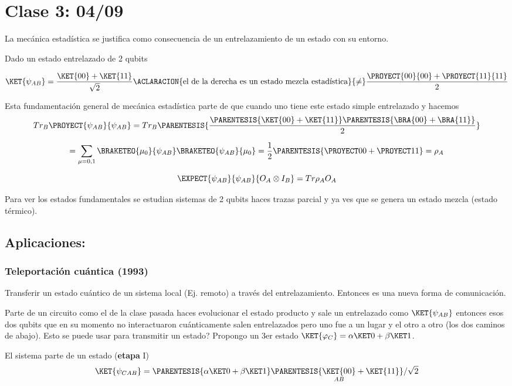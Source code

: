 \chapter{Clase 3: 04/09}

La mecánica estadística se justifica como consecuencia de un entrelazamiento
de un estado con su entorno.

Dado un estado entrelazado de 2 qubits

\[
\KET{\psi_{AB}}=\frac{\KET{00}+\KET{11}}{\sqrt{2}}\ACLARACION{\text{el de la derecha es un estado mezcla estadística}}{\neq}\frac{\PROYECT{00}{00}+\PROYECT{11}{11}}{2}
\]

Esta fundamentación general de mecánica estadística parte de que cuando
uno tiene este estado simple entrelazado y hacemos 
\[
Tr_{B}\PROYECT{\psi_{AB}}{\psi_{AB}}=Tr_{B}\PARENTESIS{\frac{\PARENTESIS{\KET{00}+\KET{11}}\PARENTESIS{\BRA{00}+\BRA{11}}}{2}}
\]

\[
=\sum_{\mu=0,1}\BRAKETEO{\mu_{0}}{\psi_{AB}}\BRAKETEO{\psi_{AB}}{\mu_{0}}=\frac{1}{2}\PARENTESIS{\PROYECT 00+\PROYECT 11}=\rho_{A}
\]

\[
\EXPECT{\psi_{AB}}{\psi_{AB}}{O_{A}\otimes I_{B}}=Tr\rho_{A}O_{A}
\]

Para ver los estados fundamentales se estudian sistemas de 2 qubits
haces trazas parcial y ya ves que se genera un estado mezcla (estado
térmico).

\section{Aplicaciones: }

\subsection{Teleportación cuántica (1993)}

Transferir un estado cuántico de un sistema local (Ej. remoto) a través
del entrelazamiento. Entonces es una nueva forma de comunicación. 

Parte de un circuito como el de la clase pasada haces evolucionar
el estado producto y sale un entrelazado como $\KET{\psi_{AB}}$ entonces
esos dos qubits que en su momento no interactuaron cuánticamente salen
entrelazados pero uno fue a un lugar y el otro a otro (los dos caminos
de abajo). Esto se puede usar para transmitir un estado? Propongo
un 3er estado $\KET{\varphi_{C}}=\alpha\KET 0+\beta\KET 1$.

El sistema parte de un estado (\textbf{etapa }I)
\[
\KET{\psi_{CAB}}=\PARENTESIS{\alpha\KET 0+\beta\KET 1}\PARENTESIS{\underset{AB}{\KET{00}}+\KET{11}}/\sqrt{2}
\]

